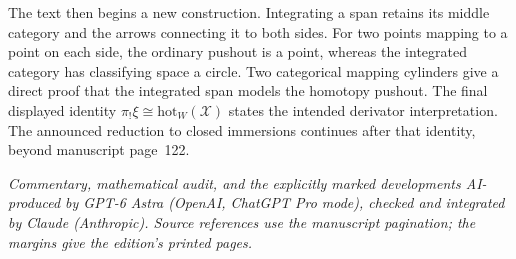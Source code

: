 The text then begins a new construction. Integrating a span retains its middle category and the arrows connecting it to both sides. For two points mapping to a point on each side, the ordinary pushout is a point, whereas the integrated category has classifying space a circle. Two categorical mapping cylinders give a direct proof that the integrated span models the homotopy pushout. The final displayed identity $\pi_!\xi\cong\mathrm{hot}_W(\mathscr X)$ states the intended derivator interpretation. The announced reduction to closed immersions continues after that identity, beyond manuscript page~122.

\medskip
\noindent\textit{Commentary, mathematical audit, and the explicitly marked developments AI-produced by GPT-6 Astra (OpenAI, ChatGPT Pro mode), checked and integrated by Claude (Anthropic). Source references use the manuscript pagination; the margins give the edition's printed pages.}
\endgroup
